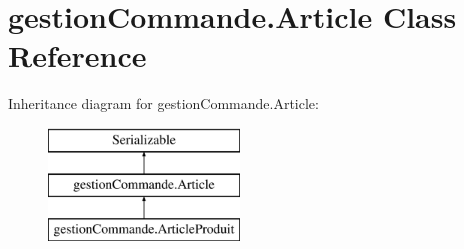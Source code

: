 \hypertarget{classgestion_commande_1_1_article}{\section{gestion\-Commande.\-Article Class Reference}
\label{classgestion_commande_1_1_article}
}
Inheritance diagram for gestion\-Commande.\-Article\-:\begin{figure}[H]
\begin{center}
\leavevmode
\includegraphics[height=3.000000cm]{classgestion_commande_1_1_article}
\end{center}
\end{figure}
